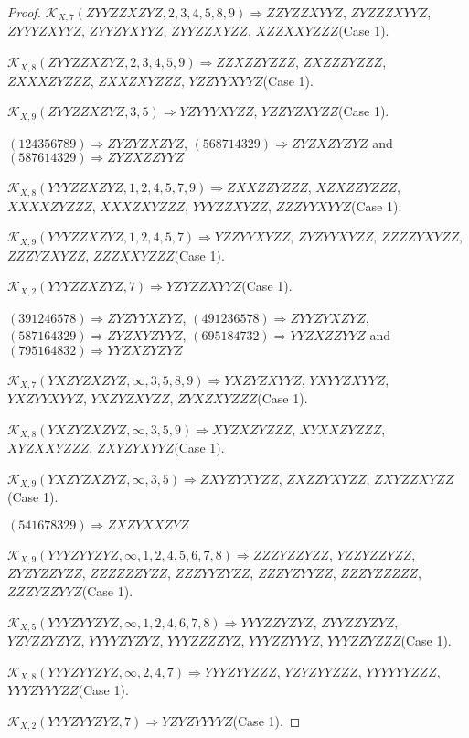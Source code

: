 \documentclass[12pt]{article}
\theoremstyle{plain}
\theoremstyle{definition}
\theoremstyle{remark}
\newcommand{\fancy}[1]{\mathcal{#1}}
\def\K{\fancy{K}}
\begin{document}
\begin{proof}
	
	$\K_{X,7}(ZYYZZXZYZ,2, 3, 4, 5, 8, 9)\Rightarrow $$ZZYZZXYYZ$, $ZYZZZXYYZ$, $ZYYYZXYYZ$, $ZYYZYXYYZ$, $ZYYZZXYZZ$, $XZZXXYZZZ$(Case 1).
	
	$\K_{X,8}(ZYYZZXZYZ,2, 3, 4, 5, 9)\Rightarrow $$ZZXZZYZZZ$, $ZXZZZYZZZ$, $ZXXXZYZZZ$, $ZXXZXYZZZ$, $YZZYYXYYZ$(Case 1).
	
	$\K_{X,9}(ZYYZZXZYZ,3, 5)\Rightarrow $$YZYYYXYZZ$, $YZZYZXYZZ$(Case 1).
	
	
	
	$(1 2 4 3 5 6 7 8 9)\Rightarrow ZYZYZXZYZ$, $(5 6 8 7 1 4 3 2 9)\Rightarrow ZYZXZYZYZ$ and $(5 8 7 6 1 4 3 2 9)\Rightarrow ZYZXZZYYZ$
	
	
	$\K_{X,8}(YYYZZXZYZ,1, 2, 4, 5, 7, 9)\Rightarrow $$ZXXZZYZZZ$, $XZXZZYZZZ$, $XXXXZYZZZ$, $XXXZXYZZZ$, $YYYZZXYZZ$, $ZZZYYXYYZ$(Case 1).
	
	$\K_{X,9}(YYYZZXZYZ,1, 2, 4, 5, 7)\Rightarrow $$YZZYYXYZZ$, $ZYZYYXYZZ$, $ZZZZYXYZZ$, $ZZZYZXYZZ$, $ZZZXXYZZZ$(Case 1).
	
	$\K_{X,2}(YYYZZXZYZ,7)\Rightarrow $$YZYZZXYYZ$(Case 1).
	
	
	
	$(3 9 1 2 4 6 5 7 8)\Rightarrow ZYZYYXZYZ$, $(4 9 1 2 3 6 5 7 8)\Rightarrow ZYYZYXZYZ$, $(5 8 7 1 6 4 3 2 9)\Rightarrow ZYZXYZYYZ$, $(6 9 5 1 8 4 7 3 2)\Rightarrow YYZXZZYYZ$ and $(7 9 5 1 6 4 8 3 2)\Rightarrow YYZXZYZYZ$
	
	
	$\K_{X,7}(YXZYZXZYZ,\infty,3, 5, 8, 9)\Rightarrow $$YXZYZXYYZ$, $YXYYZXYYZ$, $YXZYYXYYZ$, $YXZYZXYZZ$, $ZYXZXYZZZ$(Case 1).
	
	$\K_{X,8}(YXZYZXZYZ,\infty,3, 5, 9)\Rightarrow $$XYZXZYZZZ$, $XYXXZYZZZ$, $XYZXXYZZZ$, $ZXYZYXYYZ$(Case 1).
	
	$\K_{X,9}(YXZYZXZYZ,\infty,3, 5)\Rightarrow $$ZXYZYXYZZ$, $ZXZZYXYZZ$, $ZXYZZXYZZ$(Case 1).
	
	
	
	$(5 4 1 6 7 8 3 2 9)\Rightarrow ZXZYXXZYZ$
	
	
	$\K_{X,9}(YYYZYYZYZ,\infty,1, 2, 4, 5, 6, 7, 8)\Rightarrow $$ZZZYZZYZZ$, $YZZYZZYZZ$, $ZYZYZZYZZ$, $ZZZZZZYZZ$, $ZZZYYZYZZ$, $ZZZYZYYZZ$, $ZZZYZZZZZ$, $ZZZYZZYYZ$(Case 1).
	
	$\K_{X,5}(YYYZYYZYZ,\infty,1, 2, 4, 6, 7, 8)\Rightarrow $$YYYZZYZYZ$, $ZYYZZYZYZ$, $YZYZZYZYZ$, $YYYYZYZYZ$, $YYYZZZZYZ$, $YYYZZYYYZ$, $YYYZZYZZZ$(Case 1).
	
	$\K_{X,8}(YYYZYYZYZ,\infty,2, 4, 7)\Rightarrow $$YYYZYYZZZ$, $YZYZYYZZZ$, $YYYYYYZZZ$, $YYYZYYYZZ$(Case 1).
	
	$\K_{X,2}(YYYZYYZYZ,7)\Rightarrow $$YZYZYYYYZ$(Case 1).
	

\end{proof}
\end{document}
